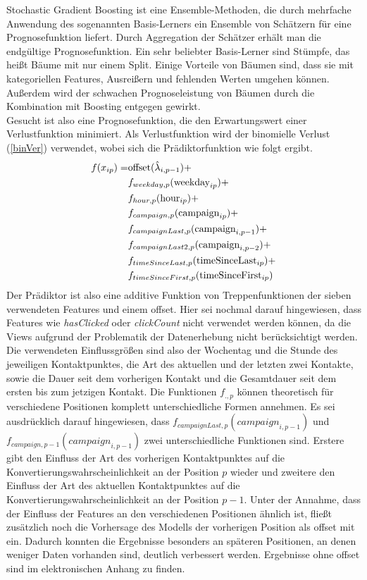 Stochastic Gradient Boosting ist eine Ensemble-Methoden, die durch mehrfache Anwendung des sogenannten Basis-Lerners ein Ensemble von Schätzern für eine Prognosefunktion liefert. Durch Aggregation der Schätzer erhält man die endgültige Prognosefunktion. Ein sehr beliebter Basis-Lerner sind Stümpfe, das heißt Bäume mit nur einem Split. Einige Vorteile von Bäumen sind, dass sie mit kategoriellen Features, Ausreißern und fehlenden Werten umgehen können. Außerdem wird der schwachen Prognoseleistung von Bäumen durch die Kombination mit Boosting entgegen gewirkt.\\
Gesucht ist also eine Prognosefunktion, die den Erwartungswert einer Verlustfunktion minimiert. Als Verlustfunktion wird der binomielle Verlust (\ref{binVer}) verwendet, wobei sich die Prädiktorfunktion wie folgt ergibt.
\begin{align}
	f(x_{ip}) =& \text{offset}(\hat{\lambda}_{i,p-1}) + \notag \\
						 &f_{weekday,p}(\text{weekday}_{ip}) + \notag \\
						 &f_{hour,p}(\text{hour}_{ip}) + \notag \\
						 &f_{campaign,p}(\text{campaign}_{ip}) + \notag \\
						 &f_{campaignLast,p}(\text{campaign}_{i,p-1}) + \notag \\
						 &f_{campaignLast2,p}(\text{campaign}_{i,p-2}) + \notag \\
						 &f_{timeSinceLast,p}(\text{timeSinceLast}_{ip}) + \notag \\
						 &f_{timeSinceFirst,p}(\text{timeSinceFirst}_{ip}) \label{praediktor}
\end{align}
Der Prädiktor ist also eine additive Funktion von Treppenfunktionen der sieben verwendeten Features und einem offset. Hier sei nochmal darauf hingewiesen, dass Features wie \textit{hasClicked} oder \textit{clickCount} nicht verwendet werden können, da die Views aufgrund der Problematik der Datenerhebung nicht berücksichtigt werden. Die verwendeten Einflussgrößen sind also der Wochentag und die Stunde des jeweiligen Kontaktpunktes, die Art des aktuellen und der letzten zwei Kontakte, sowie die Dauer seit dem vorherigen Kontakt und die Gesamtdauer seit dem ersten bis zum jetzigen Kontakt. Die Funktionen $f_{.,p}$ können theoretisch für verschiedene Positionen komplett unterschiedliche Formen annehmen. Es sei ausdrücklich darauf hingewiesen, dass $f_{campaignLast,p}(\textit{campaign}_{i,p-1})$ und $f_{campaign,p-1}(\textit{campaign}_{i,p-1})$ zwei unterschiedliche Funktionen sind. Erstere gibt den Einfluss der Art des vorherigen Kontaktpunktes auf die Konvertierungswahrscheinlichkeit an der Position $p$ wieder und zweitere den Einfluss der Art des aktuellen Kontaktpunktes auf die Konvertierungswahrscheinlichkeit an der Position $p-1$. Unter der Annahme, dass der Einfluss der Features an den verschiedenen Positionen ähnlich ist, fließt zusätzlich noch die Vorhersage des Modells der vorherigen Position als offset mit ein. Dadurch konnten die Ergebnisse besonders an späteren Positionen, an denen weniger Daten vorhanden sind, deutlich verbessert werden. Ergebnisse ohne offset sind im elektronischen Anhang zu finden.\\
